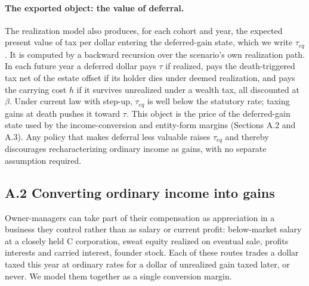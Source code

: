 \documentclass[10pt,twocolumn]{article}
\begin{document}
\paragraph{The exported object: the value of deferral.}
The realization model also produces, for each cohort and year, the expected
present value of tax per dollar entering the deferred-gain state, which we
write $\tau_{eq}$. It is computed by a backward recursion over the scenario's
own realization path. In each future year a deferred dollar pays $\tau$ if
realized, pays the death-triggered tax net of the estate offset if its holder
dies under deemed realization, and pays the carrying cost $h$ if it survives
unrealized under a wealth tax, all discounted at $\beta$. Under current law
with step-up, $\tau_{eq}$ is well below the statutory rate; taxing gains at
death pushes it toward $\tau$. This object is the price of the deferred-gain
state used by the income-conversion and entity-form margins (Sections A.2 and
A.3). Any policy that makes deferral less valuable raises $\tau_{eq}$ and
thereby discourages recharacterizing ordinary income as gains, with no
separate assumption required.

\subsection*{A.2 Converting ordinary income into gains}

Owner-managers can take part of their compensation as appreciation in a
business they control rather than as salary or current profit: below-market
salary at a closely held C corporation, sweat equity realized on eventual
sale, profits interests and carried interest, founder stock. Each of these
routes trades a dollar taxed this year at ordinary rates for a dollar of
unrealized gain taxed later, or never. We model them together as a single
conversion margin.
\end{document}
